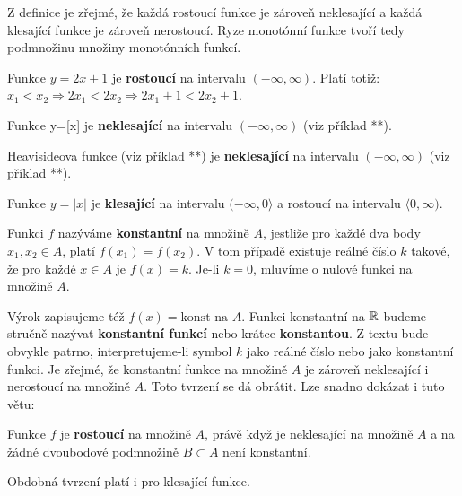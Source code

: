         Z definice je zřejmé, že každá rostoucí funkce je zároveň neklesající a každá klesající 
        funkce je zároveň nerostoucí. Ryze monotónní funkce tvoří tedy podmnožinu množiny 
        monotónních funkcí. 
           
        \begin{example}
          Funkce $y=2x+1$ je \textbf{rostoucí} na intervalu $(-\infty, \infty)$. Platí totiž: $x_1<x_2\Rightarrow 2x_1<2x_2\Rightarrow2x_1+1<2x_2+1$.
        \end{example}
        \begin{example}
          Funkce y=[x] je \textbf{neklesající} na intervalu $(-\infty, \infty)$ (viz příklad **). 
        \end{example}
        \begin{example}
          Heavisideova funkce (viz příklad **) je \textbf{neklesající} na intervalu $(-\infty, \infty)$ (viz příklad **). 
        \end{example}       
        \begin{example}
          Funkce $y=|x|$ je \textbf{klesající} na intervalu $(-\infty, 0\rangle$ a rostoucí na intervalu $\langle0, \infty)$. 
        \end{example}  
            
        \begin{definition}\label{MA1:def_lim03}
          Funkci $f$ nazýváme \textbf{konstantní} na množině $A$, jestliže pro každé dva body $x_1, 
          x_2\in A$, platí $f(x_1)=f(x_2)$. V tom případě existuje reálné číslo $k$ takové, že pro 
          každé $x\in A$ je $f(x)=k$. Je-li $k=0$, mluvíme o nulové funkci na množině $A$. 
        \end{definition} 
          
        Výrok  zapisujeme též $f(x)=\text{konst na }A$. 
        Funkci konstantní na $\mathbb{R}$ budeme stručně nazývat \textbf{konstantní funkcí} nebo 
        krátce \textbf{konstantou}. Z textu bude obvykle patrno, interpretujeme-li symbol $k$ jako 
        reálné číslo nebo jako konstantní funkci. Je zřejmé, že konstantní funkce na množině $A$ je 
        zároveň neklesající i nerostoucí na množině $A$. Toto tvrzení se dá obrátit. Lze snadno 
        dokázat i tuto větu:        
        \begin{lemma}\label{MA1:lem_lim01}
          Funkce $f$ je \textbf{rostoucí} na množině $A$, právě když je neklesající na množině $A$ a na žádné dvoubodové podmnožině $B\subset A$ není konstantní. 
        \end{lemma}
        Obdobná tvrzení platí i pro klesající funkce. 
               

